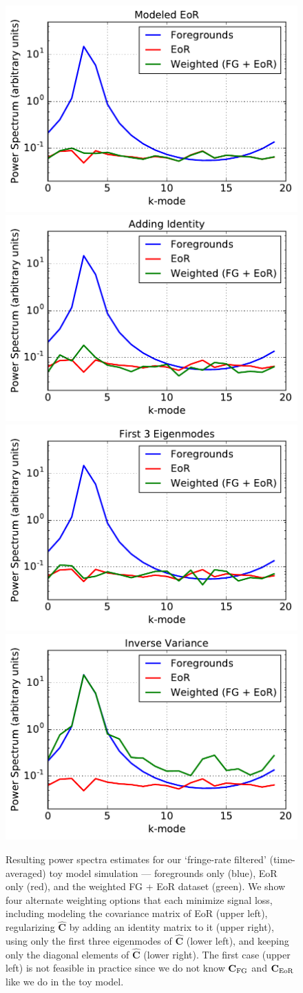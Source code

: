 \documentclass[preprint2,numberedappendix,tighten]{aastex6}
\begin{document}
\begin{figure}
	\centering
	\includegraphics[trim={0cm 0cm 0cm 0cm},clip,height=0.3\textwidth]{plots/toy_sigloss10.pdf}
	\includegraphics[trim={0cm 0cm 0cm 0cm},clip,height=0.3\textwidth]{plots/toy_sigloss8.pdf}
	\includegraphics[trim={0cm 0cm 0cm 0cm},clip,height=0.3\textwidth]{plots/toy_sigloss9.pdf}
	\includegraphics[trim={0cm 0cm 0cm 0cm},clip,height=0.3\textwidth]{plots/toy_sigloss11.pdf}
	\caption{Resulting power spectra estimates for our `fringe-rate filtered' (time-averaged) toy model simulation --- foregrounds only (blue), 
EoR only (red), and the weighted FG + EoR dataset (green). We show four alternate weighting options that each minimize signal 
loss, including modeling the covariance matrix of EoR (upper left), regularizing $\widehat{\textbf{C}}$ by adding an identity matrix to 
it (upper right), using only the first three eigenmodes of $\widehat{\textbf{C}}$ (lower left), and keeping only the diagonal elements of 
$\widehat{\textbf{C}}$ (lower right). The first case (upper left) is not feasible in practice since we do not know $\textbf{C}_{\rm FG}$ and $\textbf{C}_{\rm EoR}$ like we do in the toy model.}
	\label{fig:toy_sigloss8}
\end{figure}
\end{document}

